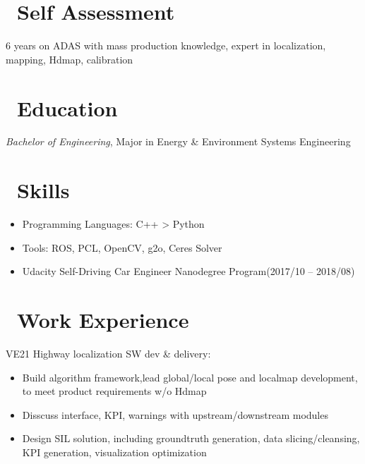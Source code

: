 \documentclass{resume}
\begin{document}



\section{\faGraduationCap\ Self Assessment}
6 years on ADAS with mass production knowledge, expert in localization, mapping, Hdmap, calibration

\section{\faGraduationCap\ Education}
\textit{Bachelor of Engineering}, Major in Energy \& Environment Systems Engineering

\section{\faCogs\ Skills}
\begin{itemize}[parsep=0.5ex]
  \item Programming Languages: C++ > Python
  \item Tools: ROS, PCL, OpenCV, g2o, Ceres Solver
  \item Udacity Self-Driving Car Engineer Nanodegree Program(2017/10 -- 2018/08)
\end{itemize}

\section{\faUsers\ Work Experience}
VE21 Highway localization SW dev \& delivery:
\begin{itemize}
  \item Build algorithm framework,lead global/local pose and localmap development, to meet product requirements w/o Hdmap
  \item Disscuss interface, KPI, warnings with upstream/downstream modules
  \item Design SIL solution, including groundtruth generation, data slicing/cleansing, KPI generation, visualization optimization
\end{itemize}
\end{document}
